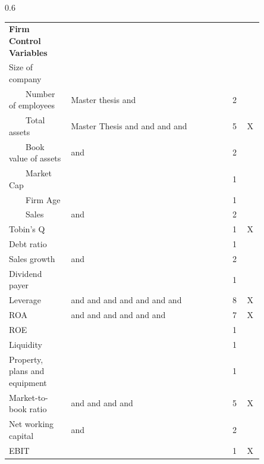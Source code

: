\documentclass[12pt,a4paper]{article}
\begin{document}
{\begin{appendix}
\begin{landscape}
\begin{spacing}{0.6}
\begin{longtable}[c]{p{0.20\linewidth} p{0.55\linewidth} p{0.05\linewidth} p{0.05\linewidth}}
\hline
\textbf{Firm Control Variables}& & &\\
Size of company &  & &\\
~~~~Number of employees & Master thesis and \cite{balyuk_divesting_2023} & 2 & \\
~~~~Total assets & Master Thesis and \cite{xu_trade_2021} and \cite{li_china-us_2020} and \cite{faraji_political_2020} and \cite{he_hurting_2017} & 5 & X\\
~~~~Book value of assets & \cite{balyuk_divesting_2023} and \cite{xu_trade_2021} & 2 & \\
~~~~Market Cap & \cite{balyuk_divesting_2023} & 1 & \\
~~~~Firm Age & \cite{balyuk_divesting_2023} & 1 & \\
~~~~Sales & \cite{balyuk_divesting_2023} and \cite{kiesel_should_2023} & 2 & \\
Tobin's Q & \cite{balyuk_divesting_2023} & 1 & X\\
Debt ratio & \cite{ghasseminejad_impact_2021} & 1  & \\
Sales growth & \cite{balyuk_divesting_2023} and \cite{faraji_political_2020}& 2 & \\
Dividend payer & \cite{balyuk_divesting_2023} & 1 &\\
Leverage & \cite{tee_financial_2023} and \cite{balyuk_divesting_2023} and \cite{ghasseminejad_impact_2021} and \cite{xu_trade_2021} and \cite{kiesel_should_2023} and \cite{li_china-us_2020} and \cite{faraji_political_2020} and \cite{he_hurting_2017} & 8 & X \\ 
ROA & \cite{tee_financial_2023} and \cite{ghasseminejad_impact_2021} and \cite{xu_trade_2021} and \cite{kiesel_should_2023} and \cite{li_china-us_2020} and \cite{faraji_political_2020} and \cite{he_hurting_2017} & 7 & X\\
ROE & \cite{tee_financial_2023} & 1 & \\
Liquidity & \cite{tee_financial_2023} & 1 & \\
Property, plans and equipment & \cite{kiesel_should_2023} & 1 & \\
Market-to-book ratio & \cite{tee_financial_2023} and \cite{ghasseminejad_impact_2021} and \cite{xu_trade_2021} and \cite{li_china-us_2020} and \cite{faraji_political_2020} & 5 & X \\
Net working capital & \cite{ghasseminejad_impact_2021} and \cite{faraji_political_2020} & 2 & \\
EBIT & \cite{ghasseminejad_impact_2021} & 1 & X \\

\end{longtable}
\end{spacing}
\end{landscape}
\end{appendix}}
\end{document}
